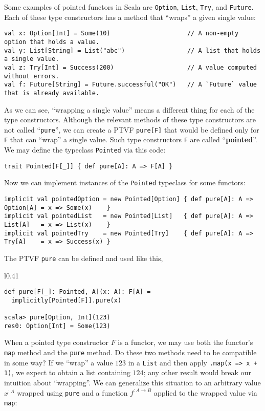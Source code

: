 Some examples of pointed functors in Scala are \lstinline!Option!,
\lstinline!List!, \lstinline!Try!, and \lstinline!Future!. Each
of these type constructors has a method that ``wraps'' a given single
value:
\begin{lstlisting}
val x: Option[Int] = Some(10)                     // A non-empty option that holds a value.
val y: List[String] = List("abc")                 // A list that holds a single value.
val z: Try[Int] = Success(200)                    // A value computed without errors.
val f: Future[String] = Future.successful("OK")   // A `Future` value that is already available.
\end{lstlisting}
As we can see, ``wrapping a single value'' means a different thing
for each of the type constructors. Although the relevant methods of
these type constructors are not called ``\lstinline!pure!'', we
can create a PTVF \lstinline!pure[F]! that would be defined only
for \lstinline!F! that can ``wrap'' a single value. Such type constructors
\lstinline!F! are called ``\textbf{pointed}''. We may define the
typeclass \lstinline!Pointed!
via this code:
\begin{lstlisting}
trait Pointed[F[_]] { def pure[A]: A => F[A] }
\end{lstlisting}
Now we can implement instances of the \lstinline!Pointed! typeclass
for some functors:
\begin{lstlisting}
implicit val pointedOption = new Pointed[Option] { def pure[A]: A => Option[A] = x => Some(x)    }
implicit val pointedList   = new Pointed[List]   { def pure[A]: A => List[A]   = x => List(x)    }
implicit val pointedTry    = new Pointed[Try]    { def pure[A]: A => Try[A]    = x => Success(x) }
\end{lstlisting}
The PTVF \lstinline!pure! can be defined and used like this,

\begin{wrapfigure}{l}{0.41\columnwidth}%
\vspace{-0.95\baselineskip}
\begin{lstlisting}
def pure[F[_]: Pointed, A](x: A): F[A] =
  implicitly[Pointed[F]].pure(x)

scala> pure[Option, Int](123)
res0: Option[Int] = Some(123)
\end{lstlisting}
\vspace{-0.95\baselineskip}
\end{wrapfigure}%

\noindent When a pointed type constructor $F$ is a functor, we may
use both the functor's \lstinline!map! method and the \lstinline!pure!
method. Do these two methods need to be compatible in some way? If
we ``wrap'' a value $123$ in a \lstinline!List! and then apply
\lstinline!.map(x => x + 1)!, we expect to obtain a list containing
$124$; any other result would break our intuition about ``wrapping''.
We can generalize this situation to an arbitrary value $x^{:A}$ wrapped
using \lstinline!pure! and a function $f^{:A\rightarrow B}$ applied
to the wrapped value via \lstinline!map!:

